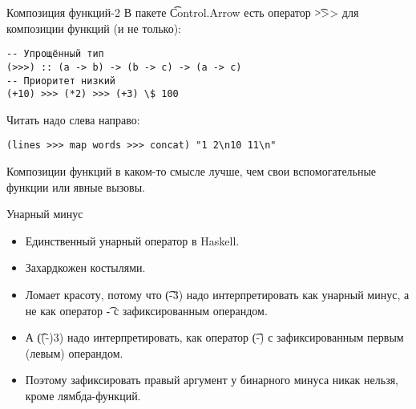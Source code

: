 \begin{frame}[fragile]{Композиция функций-2}
	В пакете \t{Control.Arrow} есть оператор \t{>>>} для композиции функций (и не только):
\begin{verbatim}
-- Упрощённый тип
(>>>) :: (a -> b) -> (b -> c) -> (a -> c)
-- Приоритет низкий
(+10) >>> (*2) >>> (+3) \$ 100
\end{verbatim}
	Читать надо слева направо:
\begin{verbatim}
(lines >>> map words >>> concat) "1 2\n10 11\n"
\end{verbatim}
	Композиции функций в каком-то смысле лучше, чем свои вспомогательные функции или явные вызовы.
\end{frame}

\begin{frame}{Унарный минус}
	\begin{itemize}
		\item Единственный унарный оператор в Haskell.
		\item Захардкожен костылями.
		\item Ломает красоту, потому что \t{(-3)} надо интерпретировать как унарный минус, а не как оператор \t{-} с зафиксированным операндом.
		\item А \t{((-)3)} надо интерпретировать, как оператор \t{(-)} с зафиксированным первым (левым) операндом.
		\item Поэтому зафиксировать правый аргумент у бинарного минуса никак нельзя, кроме лямбда-функций.
	\end{itemize}
\end{frame}
